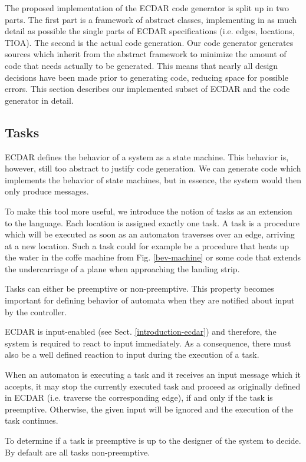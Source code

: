 The proposed implementation of the ECDAR code generator is split up
in two parts. The first part is a framework of abstract classes, implementing
in as much detail as possible the single parts of ECDAR specifications
(i.e. edges, locations, TIOA). The second is the actual code generation.
Our code generator generates sources which inherit from the abstract
framework to minimize the amount of code that needs actually to be
generated. This means that nearly all design decisions have been made
prior to generating code, reducing space for possible errors. This
section describes our implemented subset of ECDAR and the code generator
in detail.

\subsection{Tasks}

ECDAR defines the behavior of a system as a state machine. This behavior
is, however, still too abstract to justify code generation. We can
generate code which implements the behavior of state machines, but
in essence, the system would then only produce messages.

To make this tool more useful, we introduce the notion of tasks as an extension
to the language. Each location is assigned exactly one task. A task is a
procedure which will be executed as soon as an automaton traverses over an edge,
arriving at a new location. Such a task could for example be a procedure that
heats up the water in the coffe machine from Fig. \ref{bev-machine} or some code
that extends the undercarriage of a plane when approaching the landing strip.

Tasks can either be preemptive or non-preemptive. This property becomes
important for defining behavior of automata when they are notified
about input by the controller.

ECDAR is input-enabled (see Sect. \ref{introduction-ecdar}) and therefore,
the system is required to react to input immediately. As a consequence,
there must also be a well defined reaction to input during the execution
of a task.

When an automaton is executing a task and it receives an input message
which it accepts, it may stop the currently executed task and proceed
as originally defined in ECDAR (i.e. traverse the corresponding edge),
if and only if the task is preemptive. Otherwise, the given input
will be ignored and the execution of the task continues.

To determine if a task is preemptive is up to the designer of the
system to decide. By default are all tasks non-preemptive.

